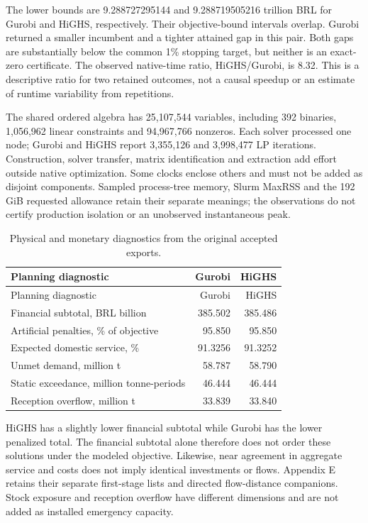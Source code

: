 \documentclass[
  english,
  11pt,
  a4paper,
  authoryear,
  preprint]{elsarticle}
\begin{document}
The lower bounds are 9.288727295144 and 9.288719505216 trillion BRL for
Gurobi and HiGHS, respectively. Their objective-bound intervals overlap.
Gurobi returned a smaller incumbent and a tighter attained gap in this
pair. Both gaps are substantially below the common 1\% stopping target,
but neither is an exact-zero certificate. The observed native-time
ratio, HiGHS/Gurobi, is 8.32. This is a descriptive ratio for two
retained outcomes, not a causal speedup or an estimate of runtime
variability from repetitions.

The shared ordered algebra has 25,107,544 variables, including 392
binaries, 1,056,962 linear constraints and 94,967,766 nonzeros. Each
solver processed one node; Gurobi and HiGHS report 3,355,126 and
3,998,477 LP iterations. Construction, solver transfer, matrix
identification and extraction add effort outside native optimization.
Some clocks enclose others and must not be added as disjoint components.
Sampled process-tree memory, Slurm MaxRSS and the 192 GiB requested
allowance retain their separate meanings; the observations do not
certify production isolation or an unobserved instantaneous peak.

\begin{longtable}[]{@{}lrr@{}}
\caption{Physical and monetary diagnostics from the original accepted
exports. }\label{tbl-scaling-h300-physical}\tabularnewline
\toprule\noalign{}
Planning diagnostic & Gurobi & HiGHS \\
\midrule\noalign{}
\endfirsthead
\toprule\noalign{}
Planning diagnostic & Gurobi & HiGHS \\
\midrule\noalign{}
\endhead
\bottomrule\noalign{}
\endlastfoot
Financial subtotal, BRL billion & 385.502 & 385.486 \\
Artificial penalties, \% of objective & 95.850 & 95.850 \\
Expected domestic service, \% & 91.3256 & 91.3252 \\
Unmet demand, million t & 58.787 & 58.790 \\
Static exceedance, million tonne-periods & 46.444 & 46.444 \\
Reception overflow, million t & 33.839 & 33.840 \\
\end{longtable}

HiGHS has a slightly lower financial subtotal while Gurobi has the lower
penalized total. The financial subtotal alone therefore does not order
these solutions under the modeled objective. Likewise, near agreement in
aggregate service and costs does not imply identical investments or
flows. Appendix E retains their separate first-stage lists and directed
flow-distance companions. Stock exposure and reception overflow have
different dimensions and are not added as installed emergency capacity.
\end{document}
